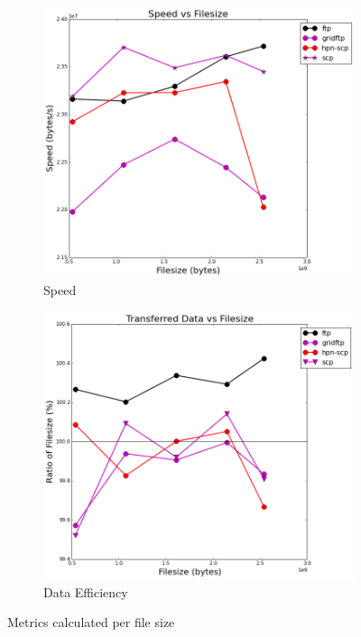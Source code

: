\documentclass{sig-alternate-05-2015}
\begin{document}
\begin{figure}
\centering
	\begin{subfigure}{.4\textwidth}
	\includegraphics[width=\textwidth]{img/per_filesize/speed.png}
	\caption{Speed}
	\label{fig:per_fs_speed}
	\end{subfigure}
	\begin{subfigure}{.4\textwidth}
	\includegraphics[width=\textwidth]{img/per_filesize/data.png}
	\caption{Data Efficiency}
	\label{fig:per_fs_data}
	\end{subfigure}
\caption{Metrics calculated per file size}
\label{fig:per_fs}
\end{figure}
\end{document}
